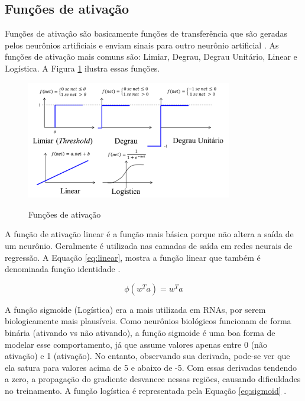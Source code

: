 \subsection{Funções de ativação}

Funções de ativação são basicamente funções de transferência que são geradas pelos neurônios artificiais e enviam sinais para outro neurônio artificial \cite{ann}. As funções de ativação mais comuns são: Limiar, Degrau, Degrau Unitário, Linear e Logística. A Figura \ref{fig:funcao-ativacao} ilustra essas funções. 

\begin{figure}[h]
    \caption{Funções de ativação}
    \centering
    \includegraphics[width=0.8\textwidth]{Textuais/Figuras/funcao-ativacao.png}
    \label{fig:funcao-ativacao}
\end{figure}

A função de ativação linear é a função mais básica porque não altera a saída de um neurônio. Geralmente é utilizada nas camadas de saída em redes neurais de regressão. A Equação \ref{eq:linear}, mostra a função linear que também é denominada função identidade \cite{ai}.

\begin{equation}
\label{eq:linear}
    \phi(w^Ta) =w^Ta
\end{equation}

A função sigmoide (Logística) era a mais utilizada em RNAs, por serem biologicamente mais plausíveis. Como neurônios biológicos funcionam de forma binária (ativando vs não ativando), a função sigmoide é uma boa forma de modelar esse comportamento, já que assume valores apenas entre 0 (não ativação) e 1 (ativação). No entanto, observando sua derivada, pode-se ver que ela satura para valores acima de 5 e abaixo de -5. Com essas derivadas tendendo a zero, a propagação do gradiente desvanece nessas regiões, causando dificuldades no treinamento. A função logística é representada pela Equação \ref{eq:sigmoid} \cite{ai}.

